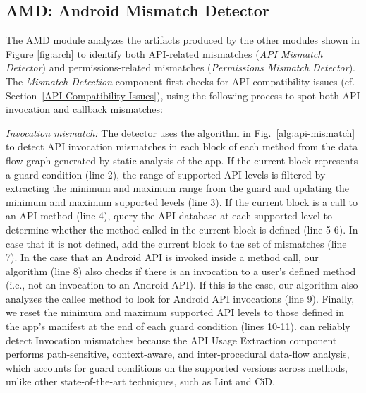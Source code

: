  
 
\subsection{AMD: Android Mismatch Detector} 
\label{mismatchdetection}

The AMD module analyzes the artifacts
produced by the other modules shown in Figure \ref{fig:arch} to identify both
API-related mismatches ({\it API Mismatch Detector}) and permissions-related
mismatches ({\it Permissions Mismatch
Detector}).
The \textit{Mismatch Detection} component first checks for API compatibility issues (cf.
Section~\ref{API Compatibility Issues}), using the following process to spot both
API invocation and callback mismatches:
 

\textit{Invocation mismatch:} The detector uses
the algorithm in Fig.~\ref{alg:api-mismatch} to detect API invocation
mismatches in each block of each method from the data flow
graph generated by static analysis of the app. If the
current block represents a guard condition (line 2), the
range of supported API levels is filtered by extracting the
minimum and maximum range from the guard and
updating the minimum and maximum supported levels (line 3).
If the current block is a call to an API method (line 4),
query the API database at each supported level to determine
whether the method called in the current block is defined
(line 5-6).  In case that it is not defined, add the current
block to the set of mismatches (line 7).
%
In the case that an Android API is invoked inside a method
call, our algorithm (line 8) also checks if there is an
invocation to a user's defined method (i.e., not an
invocation to an Android API).  If this is the case, our
algorithm also analyzes the callee method  to look
for Android API invocations (line 9).
Finally, we reset the minimum and maximum supported
API levels to those defined in the app's manifest at the end
of each guard condition (lines 10-11).
%
%
%
\@approach can reliably detect Invocation mismatches because
the API Usage Extraction component performs path-sensitive,
context-aware, and inter-procedural data-flow analysis,
which accounts for guard conditions on the
supported versions across methods, unlike other
state-of-the-art techniques, such as {\sc Lint} and {\sc
CiD}.




